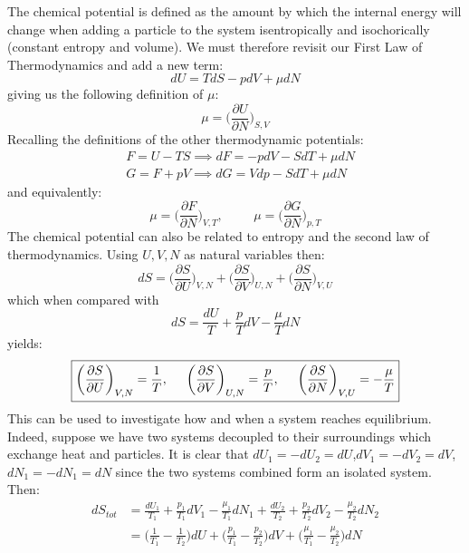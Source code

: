 \documentclass[a4paper,11pt,oneside]{book}
\begin{document}
The chemical potential is defined as the amount by which the internal energy will change when adding a particle to the system isentropically and isochorically (constant entropy and volume). We must therefore revisit our First Law of Thermodynamics and add a new term:
\begin{equation}
    \boxed{dU = TdS - pdV + \mu dN}
\end{equation}
giving us the following definition of $\mu$:
\begin{equation}
    \mu = \bigg(\frac{\partial U}{\partial N}\bigg)_{S,V}
\end{equation}
Recalling the definitions of the other thermodynamic potentials:
\begin{align}
    &F=U-TS \implies dF = -pdV - SdT + \mu dN\\
    &G=F+pV \implies dG = Vdp - SdT + \mu dN
\end{align}
and equivalently:
\begin{equation}
    \mu = \bigg(\frac{\partial F}{\partial N}\bigg)_{V,T}, \hspace{1cm} \mu = \bigg(\frac{\partial G}{\partial N}\bigg)_{p,T}
\end{equation}
The chemical potential can also be related to entropy and the second law of thermodynamics. Using $U,V,N$ as natural variables then:
\begin{equation}
    dS = \bigg(\frac{\partial S}{\partial U}\bigg)_{V,N}+\bigg(\frac{\partial S}{\partial V}\bigg)_{U,N}+\bigg(\frac{\partial S}{\partial N}\bigg)_{V,U}
\end{equation}
which when compared with 
\begin{equation}
    dS =\frac{dU}{T}+\frac{p}{T}dV - \frac{\mu}{T}dN
\end{equation}
yields:
\begin{equation}\label{entropy derivs}
   \boxed{\bigg(\frac{\partial S}{\partial U}\bigg)_{V,N} = \frac{1}{T}, \hspace{0.5cm}  \bigg(\frac{\partial S}{\partial V}\bigg)_{U,N} = \frac{p}{T}, \hspace{0.5cm}\bigg(\frac{\partial S}{\partial N}\bigg)_{V,U} = -\frac{\mu}{T}}
\end{equation}
This can be used to investigate how and when a system reaches equilibrium. Indeed, suppose we have two systems decoupled to their surroundings which exchange heat and particles. It is clear that $dU_1 = - dU_2 = dU$,$dV_1 = - dV_2 = dV$,$dN_1 = -dN_1=dN$  since the two systems combined form an isolated system. Then:
\begin{align}
    dS_{tot} &= \frac{dU_1}{T_1}+\frac{p_1}{T_1}dV_1 - \frac{\mu_1}{T_1}dN_1 + \frac{dU_2}{T_2}+\frac{p_2}{T_2}dV_2 - \frac{\mu_2}{T_2}dN_2\\
    &=\bigg(\frac{1}{T_1}-\frac{1}{T_2}\bigg)dU +\bigg(\frac{p_1}{T_1}-\frac{p_2}{T_2}\bigg)dV+\bigg(\frac{\mu_1}{T_1}-\frac{\mu_2}{T_2}\bigg)dN
\end{align}
\end{document}
